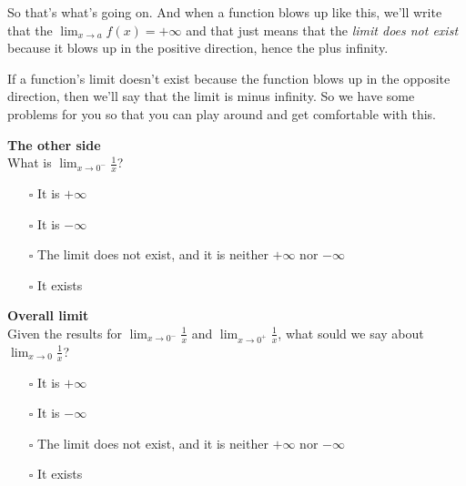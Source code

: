 \documentclass[pdftex, brazil, 12pt, twoside]{article}
\begin{document}
\begin{figure}[H]
  \begin{center}
  \end{center}
\end{figure}

So that's what's going on.
And when a function blows up like this,
we'll write that the $\lim_{x \to a}f(x)=+\infty$
and that just means that the \emph{limit does not
exist} because it blows up in the positive direction, hence
the plus infinity.

If a function's limit doesn't exist because the function
blows up in the opposite direction,
then we'll say that the limit is minus infinity.
So we have some problems for you so
that you can play around and get comfortable with this.

\begin{exercise}
  \textbf{The other side}\\
  What is $\displaystyle \lim_{x \to 0^-}\frac{1}{x}$?
  \begin{itemize}[noitemsep]
  \item[$\square$] It is $+\infty$
  \item[$\square$] It is $-\infty$
  \item[$\square$] The limit does not exist, and it is neither $+\infty$ nor $-\infty$
  \item[$\square$] It exists
  \end{itemize}
\end{exercise}

\begin{exercise}
  \textbf{Overall limit}\\
  Given the results for $\displaystyle \lim_{x \to 0^-}\frac{1}{x}$ and
  $\displaystyle \lim_{x \to 0^+}\frac{1}{x}$, what sould we say about
  $\displaystyle \lim_{x \to 0}\frac{1}{x}$?
  \begin{itemize}[noitemsep]
  \item[$\square$] It is $+\infty$
  \item[$\square$] It is $-\infty$
  \item[$\square$] The limit does not exist, and it is neither $+\infty$ nor $-\infty$
  \item[$\square$] It exists
  \end{itemize}
\end{exercise}
\end{document}
